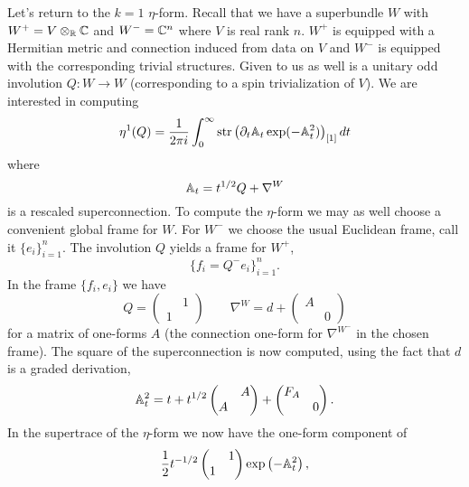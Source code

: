 \documentclass{amsart}
\begin{document}
Let's return to the $k=1$ $\eta$-form. Recall that we have a superbundle $W$ with
$W^+=V\otimes_{\mathbb{R}}\mathbb{C}$ and $W^-=\mathbb{C}^n$ where $V$ is real rank $n$. $W^+$ is equipped
with a Hermitian metric and connection induced from data on $V$ and $W^-$ is equipped
with the corresponding trivial structures. Given to us as well is a unitary odd
involution $Q:W\to W$ (corresponding to a spin trivialization of $V$). We are
interested in computing
\begin{equation*}
    \eta^1(Q) = \frac{1}{2\pi i}\int_0^\infty \operatorname{str}\left( \partial_t\mathbb{A}_t\exp(-\mathbb{A}_t^2) \right)_{[1]} dt
\end{equation*}
where
\begin{equation*}
    \mathbb{A}_t = t^{1/2}Q + \nabla^W
\end{equation*}
is a rescaled superconnection. To compute the $\eta$-form we may as well choose
a convenient global frame for $W$. For $W^-$ we choose the usual Euclidean frame,
call it $\{e_i\}_{i=1}^n$. The involution $Q$ yields a frame for $W^+$,
\begin{equation*}
    \{f_i=Q^-e_i\}_{i=1}^n.
\end{equation*}
In the frame $\{f_i,e_i\}$ we have
\begin{equation*}
    Q=
    \begin{pmatrix}
        &1\\1&
    \end{pmatrix}
    \qquad
    \nabla^W=d+
    \begin{pmatrix}
        A&\\&0
    \end{pmatrix}
\end{equation*}
for a matrix of one-forms $A$ (the connection one-form for $\nabla^{W^-}$ in the chosen
frame). The square of the superconnection is now computed, using the fact that $d$ is
a graded derivation,
\begin{equation*}
    \mathbb{A}_t^2 = t + t^{1/2}
    \begin{pmatrix}
        &A\\A&
    \end{pmatrix}
    +
    \begin{pmatrix}
        F_A&\\&0
    \end{pmatrix}.
\end{equation*}
In the supertrace of the $\eta$-form we now have the one-form component of
\begin{equation*}
    \frac{1}{2}t^{-1/2}
    \begin{pmatrix}
        &1\\1&
    \end{pmatrix}
    \exp\left( -\mathbb{A}_t^2 \right),
\end{equation*}
\end{document}
